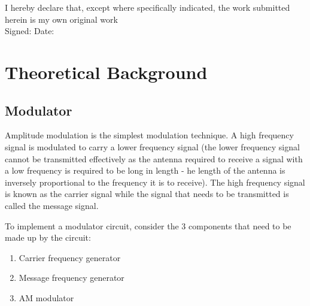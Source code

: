 \documentclass[12pt, a4paper]{article}
\begin{document}
	\begin{titlepage}
		\vspace*{1.5cm}
		\vspace*{1.5cm}
		\vspace*{1.5cm}
		\vspace*{0.5cm}
		\vspace*{0.1cm}
		\vspace*{0.1cm}
		\vspace*{0.1cm}
		\vspace*{0.3cm}
		\makebox[\textwidth]{\today}
		\vfill
		\noindent I hereby declare that, except where specifically indicated, the work submitted herein is my own original work\\
		Signed: \hspace*{5cm} Date:
	\end{titlepage}

	\tableofcontents
	\listoffigures
	\newpage

\section{Theoretical Background}
\label{sec:theoretical_background}
	\subsection{Modulator}
		Amplitude modulation is the simplest modulation technique. A high frequency signal is modulated to carry a lower frequency signal (the lower frequency signal cannot be transmitted effectively as the antenna required to receive a signal with a low frequency is required to be long in length - he length of the antenna is inversely proportional to the frequency it is to receive). The high frequency signal is known as the carrier signal while the signal that needs to be transmitted is called the message signal.

		To implement a modulator circuit, consider the 3 components that need to be made up by the circuit:
		\begin{enumerate}
			\item Carrier frequency generator
			\item Message frequency generator
			\item AM modulator
		\end{enumerate}
\end{document}

